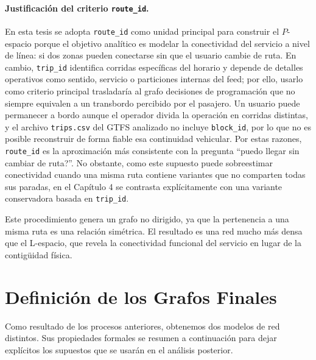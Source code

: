             \paragraph{Justificación del criterio \texttt{route\_id}.}
            En esta tesis se adopta \texttt{route\_id} como unidad principal para construir el \(P\)-espacio porque el objetivo analítico es modelar la conectividad del servicio a nivel de línea: si dos zonas pueden conectarse sin que el usuario cambie de ruta. En cambio, \texttt{trip\_id} identifica corridas específicas del horario y depende de detalles operativos como sentido, servicio o particiones internas del feed; por ello, usarlo como criterio principal trasladaría al grafo decisiones de programación que no siempre equivalen a un transbordo percibido por el pasajero. Un usuario puede permanecer a bordo aunque el operador divida la operación en corridas distintas, y el archivo \texttt{trips.csv} del GTFS analizado no incluye \texttt{block\_id}, por lo que no es posible reconstruir de forma fiable esa continuidad vehicular. Por estas razones, \texttt{route\_id} es la aproximación más consistente con la pregunta ``\invquestion{}puedo llegar sin cambiar de ruta?''. No obstante, como este supuesto puede sobreestimar conectividad cuando una misma ruta contiene variantes que no comparten todas sus paradas, en el Capítulo 4 se contrasta explícitamente con una variante conservadora basada en \texttt{trip\_id}.

            Este procedimiento genera un grafo no dirigido, ya que la pertenencia a una misma ruta es una relación simétrica. El resultado es una red mucho más densa que el L-espacio, que revela la conectividad funcional del servicio en lugar de la contigüidad física.

    \section{Definición de los Grafos Finales}
    
        Como resultado de los procesos anteriores, obtenemos dos modelos de red distintos. Sus propiedades formales se resumen a continuación para dejar explícitos los supuestos que se usarán en el análisis posterior.
        
